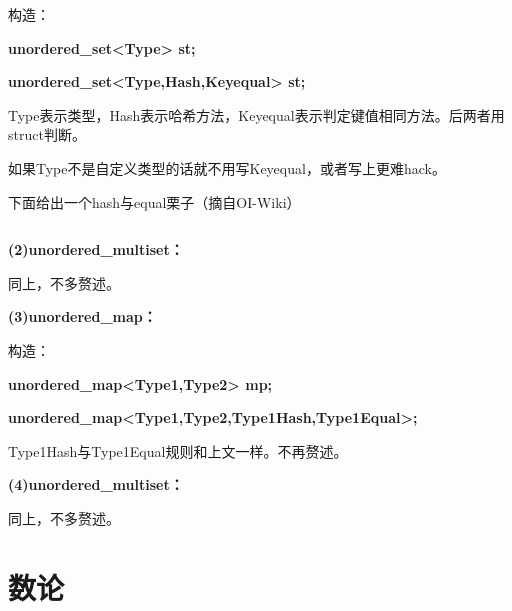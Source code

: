 \documentclass[a4paper,11pt]{article}
\begin{document}
构造：

\textbf{unordered\_set\textless{}Type\textgreater{} st;}

\textbf{unordered\_set\textless{}Type,Hash,Keyequal\textgreater{} st;}

Type表示类型，Hash表示哈希方法，Keyequal表示判定键值相同方法。后两者用struct判断。

如果Type不是自定义类型的话就不用写Keyequal，或者写上更难hack。

下面给出一个hash与equal栗子（摘自OI-Wiki）
\inputminted[linenos]{c++}{basic/hashequal.cpp}

\noindent\textbf{(2)unordered\_multiset：}

同上，不多赘述。

\noindent\textbf{(3)unordered\_map：}

构造：

\textbf{unordered\_map\textless{}Type1,Type2\textgreater{} mp;}

\textbf{unordered\_map\textless{}Type1,Type2,Type1Hash,Type1Equal\textgreater{};}

Type1Hash与Type1Equal规则和上文一样。不再赘述。

\noindent\textbf{(4)unordered\_multiset：}

同上，不多赘述。


\newpage
\section{数论}
\end{document}
